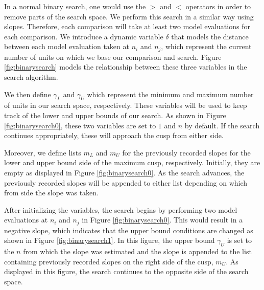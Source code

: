 \documentclass[runningheads]{llncs}
\begin{document}
In a normal binary search, one would use the $>$ and $<$ operators in order to remove parts of the search space. We perform this search in a similar way using slopes. Therefore, each comparison will take at least two model evaluations for each comparison. We introduce a dynamic variable $\delta$ that models the distance between each model evaluation taken at $n_i$ and $n_j$, which represent the current number of units on which we base our comparison and search. Figure \autoref{fig:binarysearch} models the relationship between these three variables in the search algorithm.

We then define  $\gamma_L$ and $\gamma_U$ which represent the minimum and maximum number of units in our search space, respectively. These variables will be used to keep track of the lower and upper bounds of our search. As shown in Figure \autoref{fig:binarysearch0}, these two variables are set to $1$ and $n$ by default. If the search continues appropriately, these will approach the cusp from either side.

Moreover, we define lists $m_L$ and $m_U$ for the previously recorded slopes for the lower and upper bound side of the maximum cusp, respectively. Initially, they are empty as displayed in Figure \autoref{fig:binarysearch0}. As the search advances, the previously recorded slopes will be appended to either list depending on which from side the slope was taken.

After initializing the variables, the search begins by performing two model evaluations at $n_i$ and $n_j$ in Figure \autoref{fig:binarysearch0}. This would result in a negative slope, which indicates that the upper bound conditions are changed as shown in Figure \autoref{fig:binarysearch1}. In this figure, the upper bound $\gamma_U$ is set to the $n$ from which the slope was estimated and the slope is appended to the list containing previously recorded slopes on the right side of the cusp, $m_U$. As displayed in this figure, the search continues to the opposite side of the search space.
\end{document}
